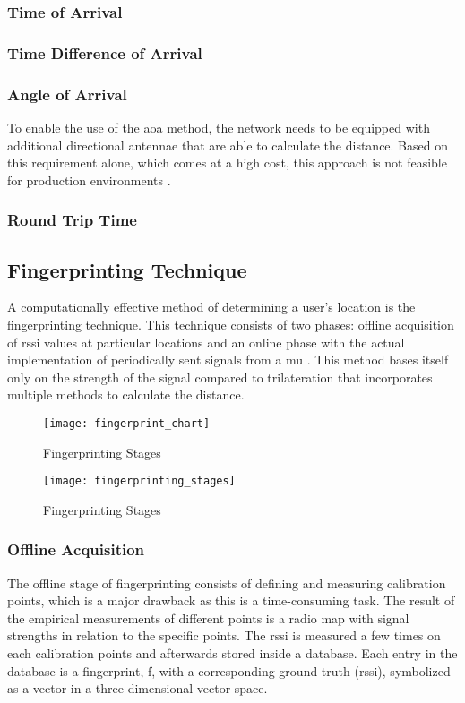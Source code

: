 \subsubsection{Time of Arrival}
\subsubsection{Time Difference of Arrival}
\subsubsection{Angle of Arrival}
To enable the use of the \acrshort{aoa} method, the network needs to be equipped with additional directional antennae that are able to calculate the distance. Based on this requirement alone, which comes at a high cost, this approach is not feasible for production environments .
\subsubsection{Round Trip Time}
\subsection{Fingerprinting Technique}
A computationally effective method of determining a user's location is the fingerprinting technique. This technique consists of two phases: offline acquisition of \acrshort{rssi} values at particular locations and an online phase with the actual implementation of periodically sent signals from a \acrshort{mu} \cite[p.~9]{Retscher}. This method bases itself only on the strength of the signal compared to trilateration that incorporates multiple methods to calculate the distance.
\begin{figure}[h!]
\centering
\texttt{[image: fingerprint\_chart]}
\caption{Fingerprinting Stages ~\cite[p.11]{S2016}}
\label{fig:fingerprint_chart}
\end{figure}
\begin{figure}[h!]
\centering
\texttt{[image: fingerprinting\_stages]}
\caption{Fingerprinting Stages ~\cite[p.2]{Li}}
\label{fig:fingerprint_stages}
\end{figure}
\subsubsection{Offline Acquisition}
The offline stage of fingerprinting consists of defining and measuring calibration points, which is a major drawback as this is a time-consuming task. The result of the empirical measurements of different points is a radio map with signal strengths in relation to the specific points. The \acrshort{rssi} is measured a few times on each calibration points and afterwards stored inside a database. Each entry in the database is a fingerprint, f, with a corresponding ground-truth (\acrshort{rssi}), symbolized as a vector in a three dimensional vector space.
